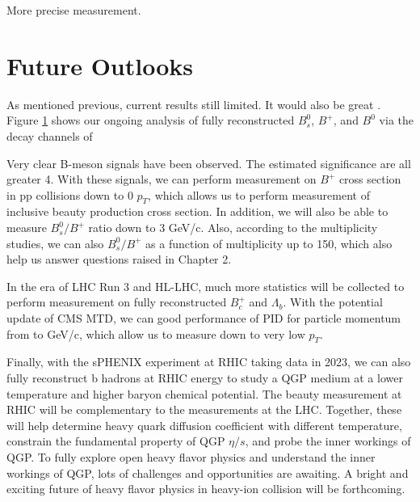 More precise measurement. 



\section{Future Outlooks}

As mentioned previous, current results still limited. It would also be great . Figure \ref{} shows our ongoing analysis of fully reconstructed $B^0_s$, $B^+$, and $B^0$ via the decay channels of 


Very clear B-meson signals have been observed. The estimated significance are all greater 4. With these signals, we can perform measurement on $B^+$ cross section in pp collisions down to 0 $p_T$, which allows us to perform measurement of inclusive beauty production cross section. In addition, we will also be able to measure $B^0_s/B^+$ ratio down to 3 GeV/c. Also, according to the multiplicity studies, we can also $B^0_s/B^+$ as a function of multiplicity up to 150, which also help us answer questions raised in Chapter 2. 

In the era of LHC Run 3 and HL-LHC, much more statistics will be collected to perform measurement on fully reconstructed $B^+_c$ and $\Lambda_b$. With the potential update of CMS MTD, we can good performance of PID for particle momentum from to GeV/c, which allow us to measure down to very low $p_T$. 

Finally, with the sPHENIX experiment at RHIC taking data in 2023, we can also fully reconstruct b hadrons at RHIC energy to study a QGP medium at a lower temperature and higher baryon chemical potential. The beauty measurement at RHIC will be complementary to the measurements at the LHC. Together, these will help determine heavy quark diffusion coefficient with different temperature, constrain the fundamental property of QGP $\eta/s$, and probe the inner workings of QGP. To fully explore open heavy flavor physics and understand the inner workings of QGP, lots of challenges and opportunities are awaiting. A bright and exciting future of heavy flavor physics in heavy-ion collision will be forthcoming.




